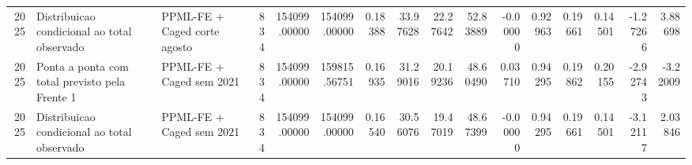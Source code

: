 \begin{tabular}{rllrrrrrrrrrrrrr}
2025 & Distribuicao condicional ao total observado & PPML-FE + Caged corte agosto & 834 & 154099.00000 & 154099.00000 & 0.18388 & 33.97628 & 22.27642 & 52.83889 & -0.00000 & 0.92963 & 0.19661 & 0.14501 & -1.27266 & 3.88698 \\
2025 & Ponta a ponta com total previsto pela Frente 1 & PPML-FE + Caged sem 2021 & 834 & 154099.00000 & 159815.56751 & 0.16935 & 31.29016 & 20.19236 & 48.60490 & 0.03710 & 0.94295 & 0.19862 & 0.20155 & -2.92743 & -3.22009 \\
2025 & Distribuicao condicional ao total observado & PPML-FE + Caged sem 2021 & 834 & 154099.00000 & 154099.00000 & 0.16540 & 30.56076 & 19.47019 & 48.67399 & -0.00000 & 0.94295 & 0.19661 & 0.14501 & -3.12117 & 2.03846 \\
\bottomrule
\end{tabular}
